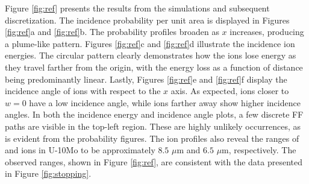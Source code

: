 \documentclass[review]{elsarticle}
\newcommand{\Y}{\ce{_{39}^{97}Y}\xspace}
\newcommand{\I}{\ce{_{53}^{136}I}\xspace}
\begin{document}
Figure \ref{fig:ref} presents the results from the simulations and subsequent discretization. The incidence probability per unit area is displayed in Figures \ref{fig:ref}a and \ref{fig:ref}b. The probability profiles broaden as $x$ increases, producing a plume-like pattern. Figures \ref{fig:ref}c and \ref{fig:ref}d illustrate the incidence ion energies. The circular pattern clearly demonstrates how the ions lose energy as they travel farther from the origin, with the energy loss as a function of distance being predominantly linear. Lastly, Figures \ref{fig:ref}e and \ref{fig:ref}f display the incidence angle of ions with respect to the $x$ axis. As expected, ions closer to $w = 0$ have a low incidence angle, while ions farther away show higher incidence angles. In both the incidence energy and incidence angle plots, a few discrete FF paths are visible in the top-left region. These are highly unlikely occurrences, as is evident from the probability figures. The ion profiles also reveal the ranges of \Y and \I ions in U-10Mo to be approximately $8.5$ $\mu$m and $6.5$ $\mu$m, respectively. The observed ranges, shown in Figure \ref{fig:ref}, are consistent with the data presented in Figure \ref{fig:stopping}.
\end{document}
